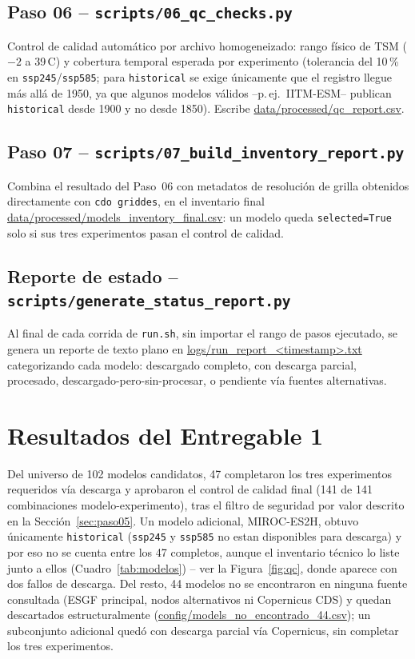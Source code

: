 \documentclass[11pt,a4paper]{article}
\newcommand{\archivo}[1]{\begingroup\hypersetup{urlcolor=black}\url{#1}\endgroup}
\begin{document}
\subsection{Paso 06 -- \texttt{scripts/06\_qc\_checks.py}}
Control de calidad autom\'atico por archivo homogeneizado: rango f\'isico de TSM ($-2$ a 39\,\textdegree C) y cobertura temporal esperada por experimento (tolerancia del 10\,\% en \texttt{ssp245}/\texttt{ssp585}; para \texttt{historical} se exige \'unicamente que el registro llegue m\'as all\'a de 1950, ya que algunos modelos v\'alidos --p.\,ej.\ IITM-ESM-- publican \texttt{historical} desde 1900 y no desde 1850). Escribe \archivo{data/processed/qc_report.csv}.

\subsection{Paso 07 -- \texttt{scripts/07\_build\_inventory\_report.py}}
Combina el resultado del Paso~06 con metadatos de resoluci\'on de grilla obtenidos directamente con \texttt{cdo griddes}, en el inventario final \archivo{data/processed/models_inventory_final.csv}: un modelo queda \texttt{selected=True} solo si sus tres experimentos pasan el control de calidad.

\subsection{Reporte de estado -- \texttt{scripts/generate\_status\_report.py}}
\label{sec:reporte}
Al final de cada corrida de \texttt{run.sh}, sin importar el rango de pasos ejecutado, se genera un reporte de texto plano en \archivo{logs/run_report_<timestamp>.txt} categorizando cada modelo: descargado completo, con descarga parcial, procesado, descargado-pero-sin-procesar, o pendiente v\'ia fuentes alternativas.

\section{Resultados del Entregable 1}
\label{sec:resultados}

Del universo de 102 modelos candidatos, 47 completaron los tres experimentos requeridos v\'ia descarga y aprobaron el control de calidad final (141 de 141 combinaciones modelo-experimento), tras el filtro de seguridad por valor descrito en la Secci\'on~\ref{sec:paso05}. Un modelo adicional, MIROC-ES2H, obtuvo \'unicamente \texttt{historical} (\texttt{ssp245} y \texttt{ssp585} no estan disponibles para descarga) y por eso no se cuenta entre los 47 completos, aunque el inventario t\'ecnico lo liste junto a ellos (Cuadro~\ref{tab:modelos}) -- ver la Figura~\ref{fig:qc}, donde aparece con dos fallos de descarga. Del resto, 44 modelos no se encontraron en ninguna fuente consultada (ESGF principal, nodos alternativos ni Copernicus CDS) y quedan descartados estructuralmente (\archivo{config/models_no_encontrado_44.csv}); un subconjunto adicional qued\'o con descarga parcial v\'ia Copernicus, sin completar los tres experimentos.
\end{document}
